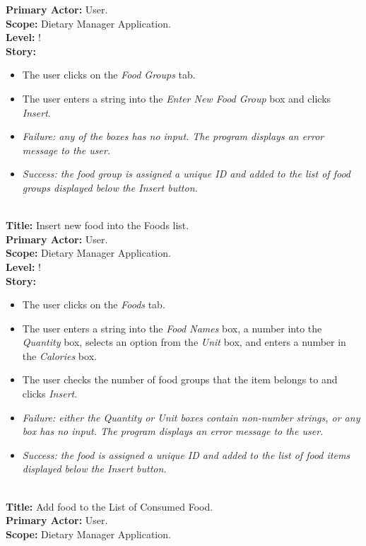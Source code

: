 \documentclass{article}
\begin{document}
\textbf{Primary Actor:} User.
\\
\textbf{Scope:} Dietary Manager Application.
\\
\textbf{Level:} !
\\
\textbf{Story:}
\begin{itemize}
    \item The user clicks on the \textit{Food Groups} tab.
    \item The user enters a string into the \textit{Enter New Food Group} box and clicks \textit{Insert}.
    \item \em Failure: \em any of the boxes has no input. The program displays an error message to the user.
    \item \em Success: \em the food group is assigned a unique ID and added to the list of food groups displayed below the \textit{Insert} button.\\
\end{itemize}
\\
\textbf{Title:} Insert new food into the Foods list.
\\
\textbf{Primary Actor:} User.
\\
\textbf{Scope:} Dietary Manager Application.
\\
\textbf{Level:} !
\\
\textbf{Story:} 
\begin{itemize}
    \item The user clicks on the \textit{Foods} tab.
    \item The user enters a string into the \textit{Food Names} box, a number into the \textit{Quantity} box, selects an option from the \textit{Unit} box, and enters a number in the \textit{Calories} box.
    \item The user checks the number of food groups that the item belongs to and clicks \textit{Insert}.
    \item \em Failure: \em either the Quantity or Unit boxes contain non-number strings, or any box has no input. The program displays an error message to the user.
    \item \em Success: \em the food is assigned a unique ID and added to the list of food items displayed below the \textit{Insert} button.\\
\end{itemize}
\\
\textbf{Title:} Add food to the List of Consumed Food.
\\
\textbf{Primary Actor:} User.
\\
\textbf{Scope:} Dietary Manager Application.
\end{document}
